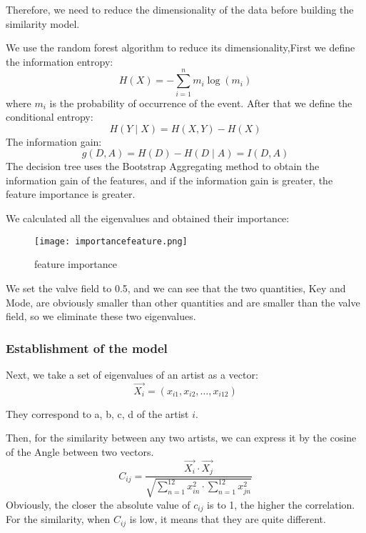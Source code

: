 \documentclass[12pt]{article}  %
\begin{document}
Therefore, we need to reduce the dimensionality of the data before building the similarity model.

We use the random forest algorithm to reduce its dimensionality,First we define the information entropy:
\begin{equation}
H(X)=-\sum_{i=1}^{n} m_{i} \log \left(m_{i}\right)
\end{equation}
where $m_{i}$  is the probability of occurrence of the event. After that we define the conditional entropy:
\begin{equation}
H(Y \mid X)=H(X, Y)-H(X)
\end{equation}
The information gain:
\begin{equation}
g(D, A)=H(D)-H(D \mid A)=I(D, A)
\end{equation}
The decision tree uses the Bootstrap Aggregating method to obtain the information gain of the features, and if the information gain is greater, the feature importance is greater.

We calculated all the eigenvalues and obtained their importance:

\begin{figure}[H]
    \centering
    \texttt{[image: importancefeature.png]}
    \caption{feature importance}
    \label{img}
\end{figure}
We set the valve field to 0.5, and we can see that the two quantities, Key and Mode, are obviously smaller than other quantities and are smaller than the valve field, so we eliminate these two eigenvalues.

\subsubsection{Establishment of the model}
Next, we take a set of eigenvalues of an artist as a vector:
\begin{equation}
\overrightarrow{X_i } =( x_{i1},x_{i2},\dots,x_{i12})
\end{equation}

They correspond to a, b, c, d of the artist $i$.

Then, for the similarity between any two artists, we can express it by the cosine of the Angle between two vectors.
\begin{equation}
C_{ij}=\frac{\overrightarrow{X_i}\cdot \overrightarrow{X_j}  }{\sqrt{\sum_{n = 1}^{12}x_{in}^2\cdot \sum_{n = 1}^{12}x_{jn}^2  } } 
\end{equation}
Obviously, the closer the absolute value of $c_{ij}$ is to 1, the higher the correlation. For the similarity, when $C_{ij}$ is low, it means that they are quite different.
\end{document}
